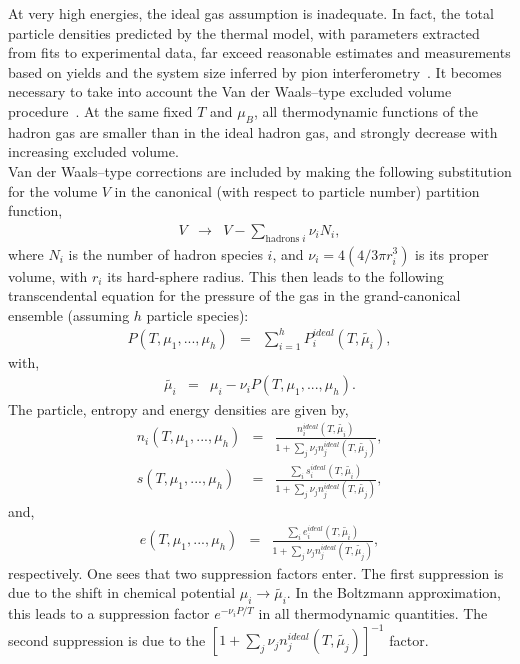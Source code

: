 \documentclass{elsarticle}
\begin{document}
At very high energies, the ideal gas assumption is inadequate. In fact, the 
total particle densities predicted by the thermal model, with parameters 
extracted from fits to experimental data, far exceed reasonable estimates 
and measurements based on yields and the system size inferred by pion 
interferometry~\cite{Yen:1997rv}. It becomes necessary to take into account the Van der Waals--type excluded 
volume procedure~\cite{Yen:1997rv,Rischke:1991ke,Cleymans:1992jz}. At the same fixed $T$ and $\mu_B$, all 
thermodynamic functions of the hadron gas are smaller than in the ideal 
hadron gas, and strongly decrease with increasing excluded volume.\\

Van der Waals--type corrections are included by making the following substitution for the volume $V$ in 
the canonical (with respect to particle number) partition function, 
\begin{eqnarray}
V &\rightarrow& V-\sum_{\mathrm{hadrons}\;i}\nu_i N_i, 
\end{eqnarray}
where $N_i$ is the number of hadron species $i$, and 
$\nu_i=4\left(4/3\pi r_i^3\right)$ is its proper volume, with $r_i$ its 
hard-sphere radius. This then leads to the following transcendental equation for the 
pressure of the gas in the grand-canonical ensemble (assuming $h$ particle species):
\begin{eqnarray}
P(T,\mu_1,...,\mu_h) &=& \sum_{i=1}^{h}P_i^{ideal}(T,\tilde{\mu_i}),
\end{eqnarray}
with,
\begin{eqnarray}
\tilde{\mu_i} &=& \mu_i - \nu_i P(T,\mu_1,...,\mu_h).
\end{eqnarray}
The particle, entropy and energy densities are given by,
\begin{eqnarray}
n_i(T,\mu_1,...,\mu_h) &=& \frac{n_i^{ideal}(T,\tilde{\mu_i})}{1+\sum_j\nu_jn_j^{ideal}(T,\tilde{\mu_j})},\\
s(T,\mu_1,...,\mu_h) &=& \frac{\sum_i s_i^{ideal}(T,\tilde{\mu_i})}{1+\sum_j\nu_jn_j^{ideal}(T,\tilde{\mu_j})},
\end{eqnarray}
and,
\begin{eqnarray}
e(T,\mu_1,...,\mu_h) &=& \frac{\sum_i e_i^{ideal}(T,\tilde{\mu_i})}{1+\sum_j\nu_jn_j^{ideal}(T,\tilde{\mu_j})},
\end{eqnarray}
respectively. One sees that two suppression factors enter. The first suppression is due to the shift in chemical 
potential $\mu_i\rightarrow\tilde{\mu_i}$. In the Boltzmann approximation, this leads to a 
suppression factor $e^{-\nu_iP/T}$ in all thermodynamic quantities. The second suppression is due to the 
$[1+\sum_j\nu_jn_j^{ideal}(T,\tilde{\mu_j})]^{-1}$ factor.\\
\end{document}
